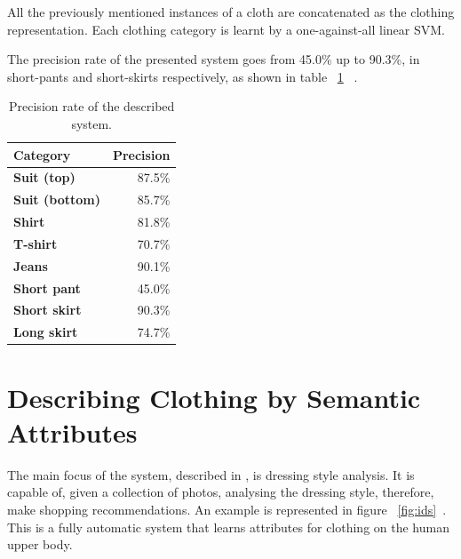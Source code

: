 \documentclass[titlepage,12pt,a4paper,times]{book}
\begin{document}
All the previously mentioned instances of a cloth are concatenated as the
clothing representation. Each clothing category is learnt by a
one-against-all linear \ac{SVM}.

The precision rate of the presented system goes from 45.0\% up to 90.3\%,
in short-pants and short-skirts respectively, as shown in table ~\ref{tab:prds}
 ~\citep{1}.

 \begin{table}[!h]
\centering
\begin{tabular}{|l|r|}
\hline
\textbf{Category} & \textbf{Precision}\\
\hline
\hline
\textbf{Suit (top)} & 87.5\% \\
\hline
\textbf{Suit (bottom)} & 85.7\% \\
\hline
\textbf{Shirt} & 81.8\% \\
\hline
\textbf{T-shirt} & 70.7\% \\
\hline
\textbf{Jeans} & 90.1\% \\
\hline
\textbf{Short pant} & 45.0\% \\
\hline
\textbf{Short skirt} & 90.3\% \\
\hline
\textbf{Long skirt} & 74.7\% \\
\hline
\end{tabular}
\caption{Precision rate of the described system.}
\label{tab:prds}
\end{table}
\FloatBarrier

\section{Describing Clothing by Semantic Attributes}
\label{chap2:sec:art2}

The main focus of the system, described in \citep{2}, is dressing style
analysis. It is capable of, given a collection of photos, analysing the
dressing style, therefore, make shopping recommendations. An example is
represented in figure ~\ref{fig:ids}~\citep{2}. This is a fully automatic
system that learns attributes for clothing on the human upper body.
\end{document}
